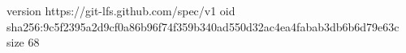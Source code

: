 version https://git-lfs.github.com/spec/v1
oid sha256:9c5f2395a2d9cf0a86b96f74f359b340ad550d32ac4ea4fabab3db6b6d79e63c
size 68
